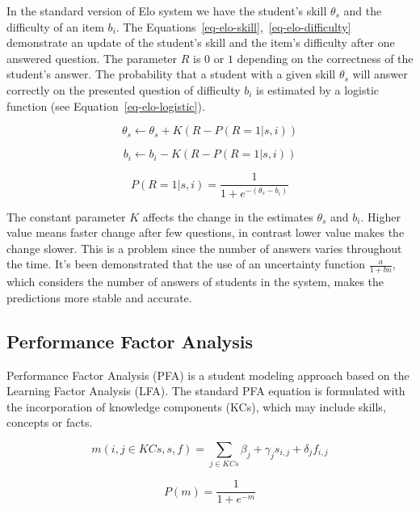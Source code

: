 In the standard version of Elo system we have the student's skill $\theta_s$ and the difficulty of an item $b_i$. The Equations~\ref{eq-elo-skill},~\ref{eq-elo-difficulty} demonstrate an update of the student's skill and the item's difficulty after one answered question. The parameter $R$ is $0$ or $1$ depending on the correctness of the student's answer. The probability that a student with a given skill $\theta_s$ will answer correctly on the presented question of difficulty $b_i$ is estimated by a logistic function (see Equation~\ref{eq-elo-logistic}).

\begin{equation} \label{eq-elo-skill}
  \theta_s \gets \theta_s + K(R - P(R = 1|s,i))
\end{equation}

\begin{equation} \label{eq-elo-difficulty}
  b_i \gets b_i - K(R - P(R = 1|s,i))
\end{equation}

\begin{equation} \label{eq-elo-logistic}
  P(R = 1|s,i) = \frac{1}{1 + e^{-(\theta_s - b_i)}}
\end{equation}

The constant parameter $K$ affects the change in the estimates $\theta_s$ and $b_i$. Higher value means faster change after few questions, in contrast lower value makes the change slower. This is a problem since the number of answers varies throughout the time. It's been demonstrated that the use of an uncertainty function $\frac{a}{1 + bn}$, which considers the number of answers of students in the system, makes the predictions more stable and accurate.

\subsection{Performance Factor Analysis}

Performance Factor Analysis (PFA) is a student modeling approach based on the Learning Factor Analysis (LFA). The standard PFA equation is formulated with the incorporation of knowledge components (KCs), which may include skills, concepts or facts.

\begin{equation} \label{eq-pfa-standard}
  m(i,j \in KCs,s,f) = \sum_{j \in KCs} \beta_j + \gamma_j s_{i,j} + \delta_j f_{i,j} 
\end{equation}

\begin{equation} \label{eq-pfa-standard-p}
  P(m) = \frac{1}{1 + e^{-m}}
\end{equation}

